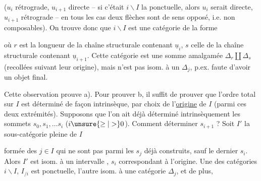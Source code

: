 
 ($u_i$ rétrograde, $u_{i+1}$ directe -- si c'était $i\backslash I$ la ponctuelle, alors $u_i$ serait directe, $u_{i+1}$ rétrograde -- en tous les cas   deux flèches sont de sens opposé, i.e. non composables).  On trouve donc que $i\backslash I$ est une catégorie de la forme


où $r$ est la longueur  de la chaîne structurale contenant $\underline{u}_i$, $s$ celle de la chaîne structurale contenant $\underline{u}_{i+1}$. Cette catégorie est une somme amalgamée $\mathbb{\Delta}_r\amalg\mathbb{\Delta}_s$ (recollées suivant leur origine), mais n'est pas isom. à un $\mathbb{\Delta}_j$, p.ex. faute d'avoir un objet final.

Cette observation prouve a). Pour prouver b, il suffit de prouver que l'ordre total sur $I$ est déterminé de façon intrinsèque,   par  choix de l'\uline{origine}  de $I$ (parmi ces deux extrémités). Supposons que l'on ait déjà déterminé intrinsèquement les sommets $s_0,s_1,\ldots s_i$ ($i\unsure{\geq|>}0$). Comment déterminer $s_{i+1}$ ?   Soit  $I'$ la sous-catégorie pleine de $I$



formée des $j\in I$ qui ne sont pas parmi les $s_j$ déjà construits, sauf  le dernier $s_i$.   Alors  $I'$ est isom. à un intervalle ,  $s_i$ correspondant à l'origine. Une des catégories $i\backslash I$, $I_{/i}$ est ponctuelle, l'autre  isom. à une catégorie $\mathbb{\Delta}_j$, et de plus,

